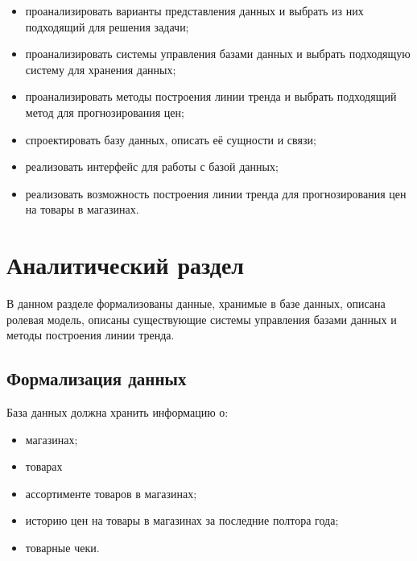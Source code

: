 \documentclass[a4paper,14pt]{extreport}
\begin{document}
\begin{itemize}
	\setlength\itemsep{0.01em}
	\item проанализировать варианты представления данных и выбрать из них подходящий для решения задачи;
	\item проанализировать системы управления базами данных и выбрать подходящую систему для хранения данных;
	\item проанализировать методы построения линии тренда и выбрать подходящий метод для прогнозирования цен;
	\item спроектировать базу данных, описать её сущности и связи;
	\item реализовать интерфейс для работы с базой данных;
	\item реализовать возможность построения линии тренда для прогнозирования цен на товары в магазинах.
\end{itemize}
	
\chapter{Аналитический раздел}

В данном разделе формализованы данные, хранимые в базе данных, описана ролевая модель, описаны существующие системы управления базами данных и методы построения линии тренда.

\section{Формализация данных}

База данных должна хранить информацию о:

\begin{itemize}
	\setlength\itemsep{0.01em}
	\item магазинах;
	\item товарах
	\item ассортименте товаров в магазинах;
	\item историю цен на товары в магазинах за последние полтора года;
	\item товарные чеки.
\end{itemize}
\end{document}
